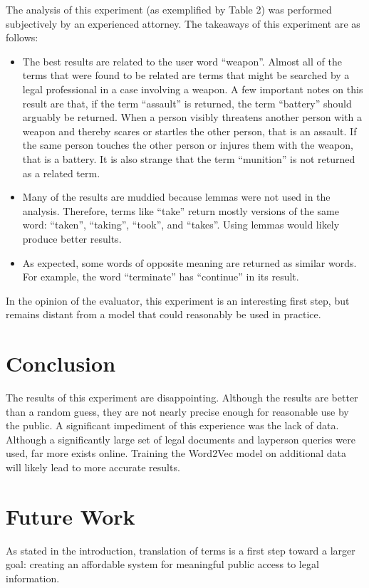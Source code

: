 \documentclass[11pt]{article}
\begin{document}
The analysis of this experiment (as exemplified by Table 2) was performed subjectively by an experienced attorney.  The takeaways of this experiment are as follows:
\begin{itemize}
	\item The best results are related to the user word ``weapon''.  Almost all of the terms that were found to be related are terms that might be searched by a legal professional in a case involving a weapon.  A few important notes on this result are that, if the term ``assault'' is returned, the term ``battery'' should arguably be returned.  When a person visibly threatens another person with a weapon and thereby scares or startles the other person, that is an assault.  If the same person touches the other person or injures them with the weapon, that is a battery.  It is also strange that the term ``munition'' is not returned as a related term.
	\item Many of the results are muddied because lemmas were not used in the analysis.  Therefore, terms like ``take'' return mostly versions of the same word: ``taken'', ``taking'', ``took'', and ``takes''.  Using lemmas would likely produce better results.
	\item As expected, some words of opposite meaning are returned as similar words.  For example, the word ``terminate'' has ``continue'' in its result.
\end{itemize}

In the opinion of the evaluator, this experiment is an interesting first step, but remains distant from a model that could reasonably be used in practice.

\section{Conclusion}
The results of this experiment are disappointing.  Although the results are better than a random guess, they are not nearly precise enough for reasonable use by the public.  A significant impediment of this experience was the lack of data.  Although a significantly large set of legal documents and layperson queries were used, far more exists online.  Training the Word2Vec model on additional data will likely lead to more accurate results.  

\section{Future Work}
As stated in the introduction, translation of terms is a first step toward a larger goal: creating an affordable system for meaningful public access to legal information. 
\end{document}

